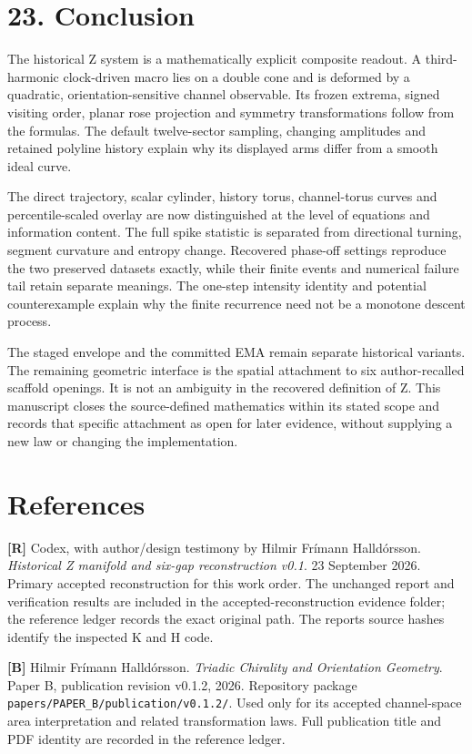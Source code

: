 \documentclass[
  11pt,
  a4paper,
]{article}
\begin{document}
\section{23. Conclusion}\label{conclusion}

The historical Z system is a mathematically explicit composite readout. A third-harmonic clock-driven macro lies on a double cone and is deformed by a quadratic, orientation-sensitive channel observable. Its frozen extrema, signed visiting order, planar rose projection and symmetry transformations follow from the formulas. The default twelve-sector sampling, changing amplitudes and retained polyline history explain why its displayed arms differ from a smooth ideal curve.

The direct trajectory, scalar cylinder, history torus, channel-torus curves and percentile-scaled overlay are now distinguished at the level of equations and information content. The full spike statistic is separated from directional turning, segment curvature and entropy change. Recovered phase-off settings reproduce the two preserved datasets exactly, while their finite events and numerical failure tail retain separate meanings. The one-step intensity identity and potential counterexample explain why the finite recurrence need not be a monotone descent process.

The staged envelope and the committed EMA remain separate historical variants. The remaining geometric interface is the spatial attachment to six author-recalled scaffold openings. It is not an ambiguity in the recovered definition of Z. This manuscript closes the source-defined mathematics within its stated scope and records that specific attachment as open for later evidence, without supplying a new law or changing the implementation.

\section{References}\label{references}

\textbf{{[}R{]}} Codex, with author/design testimony by Hilmir Frímann Halldórsson. \emph{Historical Z manifold and six-gap reconstruction v0.1}. 23 September 2026. Primary accepted reconstruction for this work order. The unchanged report and verification results are included in the accepted-reconstruction evidence folder; the reference ledger records the exact original path. The report\textquotesingle s source hashes identify the inspected K and H code.

\textbf{{[}B{]}} Hilmir Frímann Halldórsson. \emph{Triadic Chirality and Orientation Geometry}. Paper B, publication revision v0.1.2, 2026. Repository package \texttt{papers/PAPER\_B/publication/v0.1.2/}. Used only for its accepted channel-space area interpretation and related transformation laws. Full publication title and PDF identity are recorded in the reference ledger.
\end{document}
